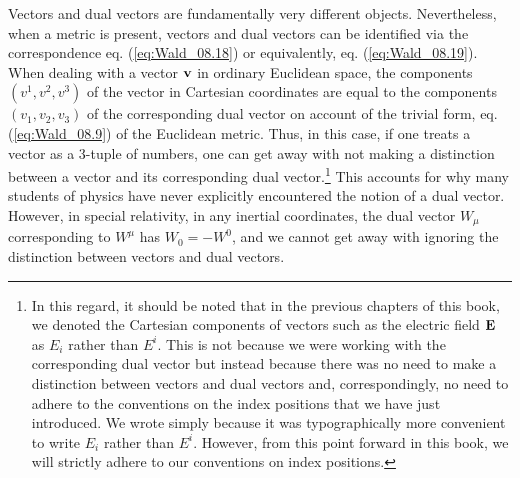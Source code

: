 Vectors and dual vectors are fundamentally very different objects. Nevertheless, when a metric is present, vectors and dual vectors can be identified via the correspondence eq. (\ref{eq:Wald_08.18}) or equivalently, eq. (\ref{eq:Wald_08.19}). When dealing with a vector 
$\vb{v}$ in ordinary Euclidean space, the components $(v^1, v^2, v^3)$ of the vector in Cartesian coordinates are equal to the components  $(v_1, v_2, v_3)$ of the corresponding dual vector on account of the trivial form, eq. (\ref{eq:Wald_08.9}) of the Euclidean metric. Thus, in this case, if one treats a vector as a 3-tuple of numbers, one can get away with not making a distinction between a vector and its corresponding dual vector.\footnote{In this regard, it should be noted that in the previous chapters of this book, we denoted the Cartesian components of vectors such as the electric field $\vb{E}$ as $E_i$ rather than $E^i$. This is not because we were working with the corresponding dual vector but instead because there was no need to make a distinction between vectors and dual vectors and, correspondingly, no need to adhere to the conventions on the index positions that we have just introduced. We wrote  simply because it was typographically more convenient to write $E_i$ rather than $E^i$. However, from this point forward in this book, we will strictly adhere to our conventions on index positions.} This accounts for why many students of physics have never explicitly encountered the notion of a dual vector. However, in special relativity, in any inertial coordinates, the dual vector $W_\mu$ corresponding to $W^\mu$ has $W_0 = - W^0$, and we cannot get away with ignoring the distinction between vectors and dual vectors.

